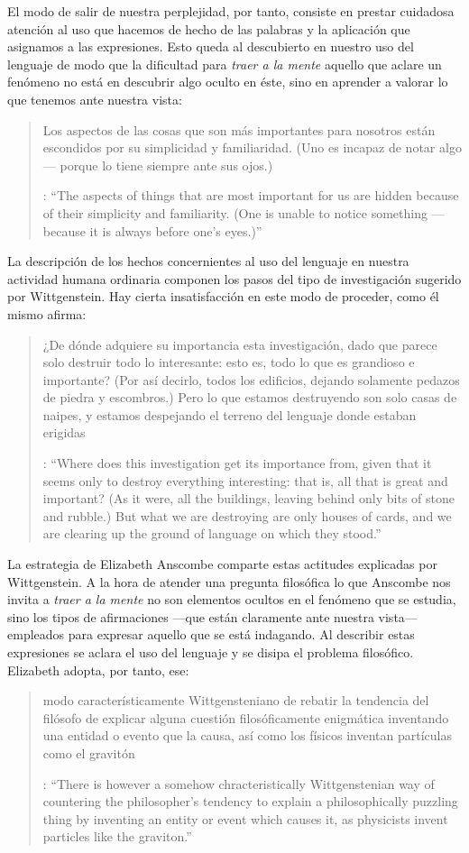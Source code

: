 El modo de salir de nuestra perplejidad, por tanto, consiste en prestar cuidadosa atención al uso que hacemos de hecho de las palabras y la aplicación que asignamos a las expresiones. Esto queda al descubierto en nuestro uso del lenguaje de modo que la dificultad para \emph{traer a la mente} aquello que aclare un fenómeno no está en descubrir algo oculto en éste, sino en aprender a valorar lo que tenemos ante nuestra vista: \blockquote[{\cite[\S129]{wittgenstein1953phiinv}}: \enquote{The aspects of things that are most important for us are hidden because of their simplicity and familiarity. (One is unable to notice something --- because it is always before one's eyes.)}]{Los aspectos de las cosas que son más importantes para nosotros están escondidos por su simplicidad y familiaridad. (Uno es incapaz de notar algo --- porque lo tiene siempre ante sus ojos.)} La descripción de los hechos concernientes al uso del lenguaje en nuestra actividad humana ordinaria componen los pasos del tipo de investigación sugerido por Wittgenstein. Hay cierta insatisfacción en este modo de proceder, como él mismo afirma: \blockquote[{\cite[\S118]{wittgenstein1953phiinv}}: \enquote{Where does this investigation get its importance from, given that it seems only to destroy everything interesting: that is, all that is great and important? (As it were, all the buildings, leaving behind only bits of stone and rubble.) But what we are destroying are only houses of cards, and we are clearing up the ground of language on which they stood.}]{¿De dónde adquiere su importancia esta investigación, dado que parece solo destruir todo lo interesante: esto es, todo lo que es grandioso e importante? (Por así decirlo, todos los edificios, dejando solamente pedazos de piedra y escombros.) Pero lo que estamos destruyendo son solo casas de naipes, y estamos despejando el terreno del lenguaje donde estaban erigidas}.

La estrategia de Elizabeth Anscombe comparte estas actitudes explicadas por Wittgenstein. A la hora de atender una pregunta filosófica lo que Anscombe nos invita a \emph{traer a la mente} no son elementos ocultos en el fenómeno que se estudia, sino los tipos de afirmaciones ---que están claramente ante nuestra vista--- empleados para expresar aquello que se está indagando. Al describir estas expresiones se aclara el uso del lenguaje y se disipa el problema filosófico. Elizabeth adopta, por tanto, ese: \blockquote[{\cite[xix]{anscombe2011plato}}: \enquote{There is however a somehow chracteristically Wittgenstenian way of countering the philosopher's tendency to explain a philosophically puzzling thing by inventing an entity or event which causes it, as physicists invent particles like the graviton.}]{modo característicamente Wittgensteniano de rebatir la tendencia del filósofo de explicar alguna cuestión filosóficamente enigmática inventando una entidad o evento que la causa, así como los físicos inventan partículas como el gravitón}.

